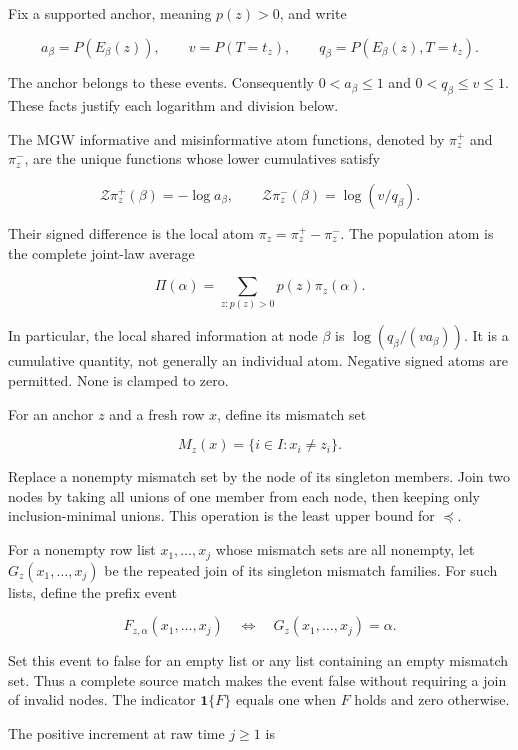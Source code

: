 Fix a supported anchor, meaning \(p(z)>0\), and write

\[
a_\beta=P(E_\beta(z)),\qquad
v=P(T=t_z),\qquad
q_\beta=P(E_\beta(z),T=t_z).
\]

The anchor belongs to these events. Consequently \(0<a_\beta\le1\) and \(0<q_\beta\le v\le1\). These facts justify each logarithm and division below.

The MGW informative and misinformative atom functions, denoted by \(\pi_z^+\) and \(\pi_z^-\), are the unique functions whose lower cumulatives satisfy

\[
\mathcal Z\pi_z^+(\beta)=-\log a_\beta,
\qquad
\mathcal Z\pi_z^-(\beta)=\log(v/q_\beta).
\]

Their signed difference is the local atom \(\pi_z=\pi_z^+-\pi_z^-\). The population atom is the complete joint-law average

\[
\Pi(\alpha)=\sum_{z:p(z)>0}p(z)\pi_z(\alpha).
\]

In particular, the local shared information at node \(\beta\) is \(\log(q_\beta/(v a_\beta))\). It is a cumulative quantity, not generally an individual atom. Negative signed atoms are permitted. None is clamped to zero.

\label{what-the-prefix-statistic-observes}

For an anchor \(z\) and a fresh row \(x\), define its mismatch set

\[
M_z(x)=\{i\in I:x_i\ne z_i\}.
\]

Replace a nonempty mismatch set by the node of its singleton members. Join two nodes by taking all unions of one member from each node, then keeping only inclusion-minimal unions. This operation is the least upper bound for \(\preceq\).

For a nonempty row list \(x_1,\ldots,x_j\) whose mismatch sets are all nonempty, let \(G_z(x_1,\ldots,x_j)\) be the repeated join of its singleton mismatch families. For such lists, define the prefix event

\[
F_{z,\alpha}(x_1,\ldots,x_j)
\quad\Longleftrightarrow\quad
G_z(x_1,\ldots,x_j)=\alpha.
\]

Set this event to false for an empty list or any list containing an empty mismatch set. Thus a complete source match makes the event false without requiring a join of invalid nodes. The indicator \(\mathbf1\{F\}\) equals one when \(F\) holds and zero otherwise.

The positive increment at raw time \(j\ge1\) is

